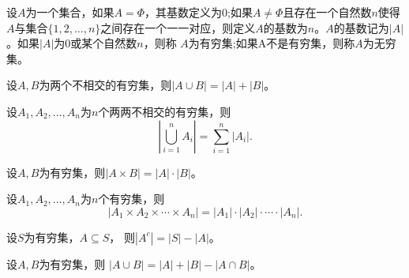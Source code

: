   \begin{Def}
设$A$为一个集合，如果$A=\Phi$，其基数定义为$0$;如果$A \neq \Phi$且存在一个自然数$n$使得$A$与集合$\{1,2,\ldots, n\}$之间存在一个一一对应，则定义$A$的基数为$n$。$A$的基数记为$|A|$。如果$|A|$为0或某个自然数$n$，则称
$A$为有穷集;如果A不是有穷集，则称$A$为无穷集。   
  \end{Def}
  \begin{Thm}
    设$A,B$为两个不相交的有穷集，则$|A \cup B| = |A| + |B|$。
  \end{Thm}
  \begin{Thm}
    设$A_1,A_2, \ldots, A_n$为$n$个两两不相交的有穷集，则\[|\bigcup_{i=1}^{n}A_i|=\sum_{i=1}^{n}|A_i|.\]
  \end{Thm}
  \begin{Thm}
    设$A,B$为有穷集，则$|A \times B| = |A| \cdot |B|$。
  \end{Thm}
  \begin{Thm}
    设$A_1,A_2, \ldots, A_n$为$n$个有穷集，则\[|A_1 \times A_2 \times \cdots \times A_n|=|A_1|\cdot |A_2| \cdot \cdots \cdot |A_n|.\]
  \end{Thm}
\begin{Thm}
  设$S$为有穷集，$A \subseteq S$， 则$|A^c| = |S| - |A|$。
\end{Thm}
\begin{Thm}
  设$A,B$为有穷集，则
$|A \cup B| = |A| + |B| - |A \cap B|$。
\end{Thm}

